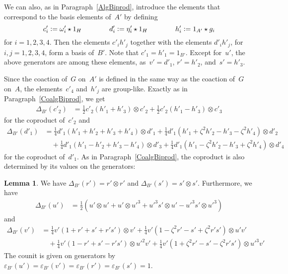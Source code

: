 \documentclass{article}
\numberwithin{equation}{section}
\theoremstyle{definition}
\newtheorem*{lem}{Lemma}
\theoremstyle{break}
\newcommand{\ot}{\mathbin{\otimes}}
\newcommand{\deq}{\vcentcolon =}
\newcommand{\K}{1}
\newcommand{\uu}{u'}
\newcommand{\vu}{v'}
\newcommand{\ru}{r'}
\newcommand{\su}{s'}
\newcommand{\omu}{\omega'}
\newcommand{\etu}{\eta'}
\newcommand{\cu}{c'}
\newcommand{\du}{d'}
\newcommand{\hu}{h'}
\newcommand{\Au}{A'}
\newcommand{\Bu}{B'}
\newcommand{\1}{{(1)}}
\newcommand{\2}{{(2)}}
\newcommand{\3}{{(3)}}
\newcommand{\HH}{1_H}
\begin{document}
We can also, as in Paragraph~\ref{AlgBiprod}, introduce the elements that correspond to the basis elements of~$\Au$ by defining
\[\cu_i \deq \omu_i \star \HH \qquad \qquad \du_i \deq \etu_i \star \HH \qquad \qquad
\hu_i \deq 1_{\Au} \star g_i \]
for $i=1,2,3,4$. Then the elements $\cu_i \hu_j$ together with the elements $\du_i \hu_j$,
for~$i,j = 1,2,3,4$, form a basis of~$\Bu$. Note that $\cu_1 = \hu_1 = 1_{\Bu}$. Except for~$\uu$, the above generators are among these elements, as~$\vu=\du_1$, $\ru=\hu_2$, and~$\su=\hu_3$.

Since the coaction of~$G$ on~$\Au$ is defined in the same way as the coaction of~$G$ on~$A$, the elements~$\cu_4$ and~$\hu_j$ are group-like. Exactly as in Paragraph~\ref{CoalgBiprod}, we get
\begin{align*}
\Delta_{\Bu}(\cu_2) &= \frac{1}{2} \cu_2(\hu_1 + \hu_3) \ot \cu_2
+ \frac{1}{2} \cu_2 (\hu_1 - \hu_3) \ot \cu_3
\end{align*}
for the coproduct of~$\cu_2$ and
\begin{align*}
\Delta_{\Bu}(\du_1) &= \frac{1}{4} \du_1(\hu_1 + \hu_2 + \hu_3 + \hu_4) \ot \du_1
+ \frac{1}{4} \du_1 (\hu_1 + \zeta^2 \hu_2 - \hu_3 - \zeta^2 \hu_4) \ot \du_2 \\
&\quad + \frac{1}{4} \du_1 (\hu_1 - \hu_2 + \hu_3 - \hu_4) \ot \du_3
+ \frac{1}{4} \du_1 (\hu_1 - \zeta^2 \hu_2 - \hu_3 + \zeta^2 \hu_4) \ot \du_4 
\end{align*}
for the coproduct of~$\du_1$. As in Paragraph~\ref{CoalgBiprod}, the coproduct is also determined by its values on the generators:
\begin{lem}
We have $\Delta_{\Bu}(\ru) = \ru \ot \ru$ and $\Delta_{\Bu}(\su) = \su \ot \su$. Furthermore, we have
\begin{align*}
\Delta_{\Bu}(\uu) &= \frac{\K}{2} (\uu \ot \uu + \uu \ot \uu^3 +  \uu^3 \su \ot \uu - \uu^3 \su \ot \uu^3)
\end{align*}
and
\begin{align*}
\Delta_{\Bu}(\vu) &= \frac{1}{4} \vu (1 + \ru + \su + \ru \su) \ot \vu
+ \frac{1}{4} \vu (1 - \zeta^2 \ru - \su + \zeta^2 \ru \su) \ot \uu \vu \\
&\quad + \frac{1}{4} \vu (1 - \ru + \su - \ru \su) \ot \uu^2 \vu
+ \frac{1}{4} \vu (1 + \zeta^2 \ru - \su - \zeta^2 \ru \su) \ot \uu^3 \vu
\end{align*}
The counit is given on generators by~$\varepsilon_{\Bu}(\uu) = \varepsilon_{\Bu}(\vu) = \varepsilon_{\Bu}(\ru) = \varepsilon_{\Bu}(\su) = 1$.
\end{lem}
\end{document}
